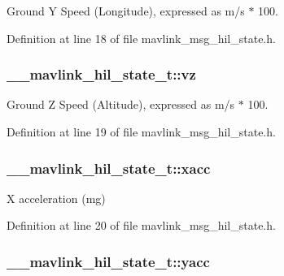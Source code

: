 Ground Y Speed (Longitude), expressed as m/s $\ast$ 100. 



Definition at line 18 of file mavlink\-\_\-msg\-\_\-hil\-\_\-state.\-h.

\hypertarget{struct____mavlink__hil__state__t_add6c834de56047ff2316d059b741cce0}{
\subsubsection[{vz}]{ \-\_\-\-\_\-mavlink\-\_\-hil\-\_\-state\-\_\-t\-::vz}}\label{struct____mavlink__hil__state__t_add6c834de56047ff2316d059b741cce0}


Ground Z Speed (Altitude), expressed as m/s $\ast$ 100. 



Definition at line 19 of file mavlink\-\_\-msg\-\_\-hil\-\_\-state.\-h.

\hypertarget{struct____mavlink__hil__state__t_a8497c1e566b9acb1d4298090c480a212}{
\subsubsection[{xacc}]{ \-\_\-\-\_\-mavlink\-\_\-hil\-\_\-state\-\_\-t\-::xacc}}\label{struct____mavlink__hil__state__t_a8497c1e566b9acb1d4298090c480a212}


X acceleration (mg) 



Definition at line 20 of file mavlink\-\_\-msg\-\_\-hil\-\_\-state.\-h.

\hypertarget{struct____mavlink__hil__state__t_a670623660d6d3d15121b2698082e8f55}{
\subsubsection[{yacc}]{ \-\_\-\-\_\-mavlink\-\_\-hil\-\_\-state\-\_\-t\-::yacc}}\label{struct____mavlink__hil__state__t_a670623660d6d3d15121b2698082e8f55}


